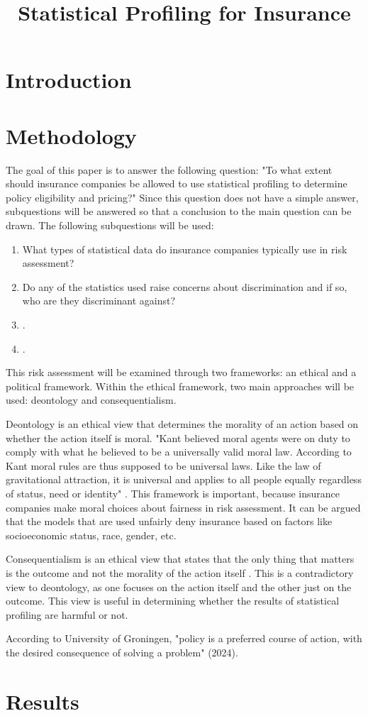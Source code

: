 \documentclass[a4paper, 12pt, table]{article}
\title{Statistical Profiling for Insurance}
\author{}
\date{}
\numberwithin{equation}{section}
\begin{document}
\section{Introduction}
\cite{texbook}
\section{Methodology}
The goal of this paper is to answer the following question: "To what extent should insurance companies be allowed to use statistical profiling to determine policy eligibility and pricing?" Since this question does not have a simple answer, subquestions will be answered so that a conclusion to the main question can be drawn. The following subquestions will be used:
\begin{enumerate}
    \item What types of statistical data do insurance companies typically use in risk assessment?
    \item Do any of the statistics used raise concerns about discrimination and if so, who are they discriminant against?
    \item.
    \item.
\end{enumerate}

This risk assessment will be examined through two frameworks: an ethical and a political framework. Within the ethical framework, two main approaches will be used: deontology and consequentialism. 

Deontology is an ethical view that determines the morality of an action based on whether the action itself is moral. "Kant believed moral agents were on duty to comply with what he believed to be a universally valid moral law. According to Kant moral rules are thus supposed to be universal laws. Like the law of gravitational attraction, it is universal and applies to all people equally regardless of status, need or identity" \cite{MSEPA_Syllabus_2025}. This framework is important, because insurance companies make moral choices about fairness in risk assessment. It can be argued that the models that are used unfairly deny insurance based on factors like socioeconomic status, race, gender, etc. 

Consequentialism is an ethical view that states that the only thing that matters is the outcome and not the morality of the action itself \cite{MSEPA_Syllabus_2025}. This is a contradictory view to deontology, as one focuses on the action itself and the other just on the outcome. This view is useful in determining whether the results of statistical profiling are harmful or not. 

According to University of Groningen, "policy is a preferred course of action, with the desired consequence of solving a problem" (2024).



\section{Results}

\end{document}

